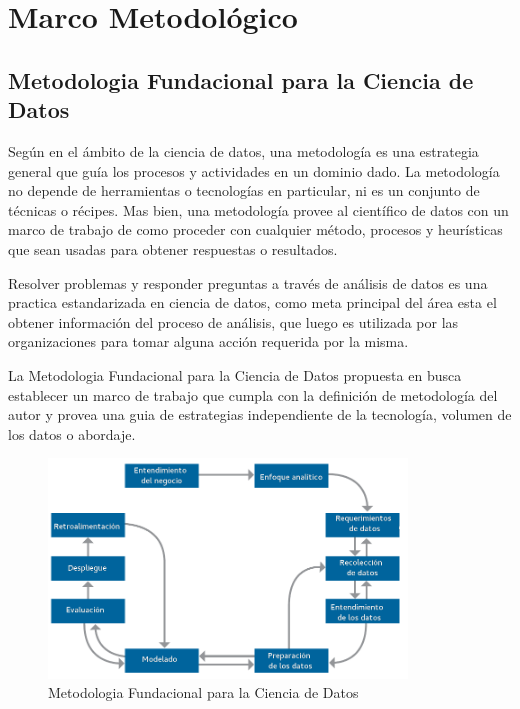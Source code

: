 \chapter{Marco Metodológico}

\section{Metodologia Fundacional para la Ciencia de Datos}

    Según \cite{foundationalmet} en el ámbito de la ciencia de datos, una metodología es una estrategia general que guía los procesos y actividades en un dominio dado. La metodología no depende de herramientas o tecnologías en particular, ni es un conjunto de técnicas o récipes. Mas bien, una metodología provee al científico de datos con un marco de trabajo de como proceder con cualquier método, procesos y heurísticas que sean usadas para obtener respuestas o resultados.


    Resolver problemas y responder preguntas a través de análisis de datos es una practica estandarizada en ciencia de datos, como meta principal del área esta el obtener información del proceso de análisis, que luego es utilizada por las organizaciones para tomar alguna acción requerida por la misma.\cite{foundationalmet}

    La Metodologia Fundacional para la Ciencia de Datos propuesta en \cite{foundationalmet} busca establecer un marco de trabajo que cumpla con la definición de metodología del autor y provea una guia de estrategias independiente de la tecnología, volumen de los datos o abordaje.


    \begin{figure}[htpb]
        \centering
        \includegraphics[width=0.85\textwidth]{Figuras/foundational_met_image.png}
        \caption{Metodologia Fundacional para la Ciencia de Datos}
        \label{fig:foundmetfig}
    \end{figure}

